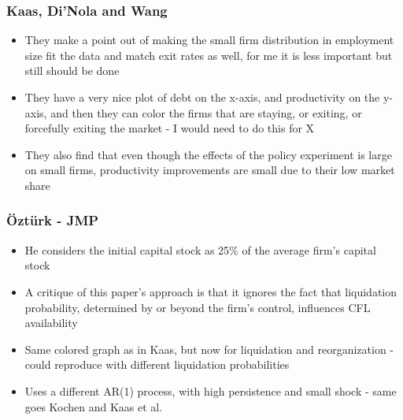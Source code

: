 \documentclass[12pt]{article}
\begin{document}
\subsubsection*{Kaas, Di'Nola and Wang}
\begin{itemize}\setlength\itemsep{0em} \small
    \item They make a point out of making the small firm distribution in employment size fit the data and match exit rates as well, for me it is less important but still should be done
    \item They have a very nice plot of debt on the x-axis, and productivity on the y-axis, and then they can color the firms that are staying, or exiting, or forcefully exiting the market - I would need to do this for X
    \item They also find that even though the effects of the policy experiment is large on small firms, productivity improvements are small due to their low market share
\end{itemize} \normalsize

\subsubsection*{Öztürk - JMP}
\begin{itemize}\setlength\itemsep{0em} \small
    \item He considers the initial capital stock as 25\% of the average firm's capital stock
    \item A critique of this paper's approach is that it ignores the fact that liquidation probability, determined by or beyond the firm's control, influences CFL availability
    \item Same colored graph as in Kaas, but now for liquidation and reorganization - could reproduce with different liquidation probabilities
    \item Uses a different AR(1) process, with high persistence and small shock - same goes Kochen and Kaas et al.
\end{itemize} \normalsize
\end{document}
